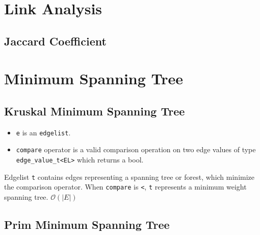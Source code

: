 \section{Link Analysis}


\subsection{Jaccard Coefficient}


\section{Minimum Spanning Tree}

\subsection{Kruskal Minimum Spanning Tree}

{\small
      
}
\begin{itemdescr}
      \pnum\preconditions
      \begin{itemize}
            \item
                  \lstinline{e} is an \lstinline{edgelist}.
            \item
                  \lstinline{compare} operator is a valid comparison operation on two edge values of type \lstinline{edge_value_t<EL>} which returns a bool.
      \end{itemize}
      \pnum\effects Edgelist \lstinline{t} contains edges representing a spanning tree or forest, which minimize the comparison operator. When \lstinline{compare} is \lstinline{<}, \lstinline{t} represents a minimum weight spanning tree.
      \pnum\complexity $\mathcal{O}(|E|)$
\end{itemdescr}

\subsection{Prim Minimum Spanning Tree}

